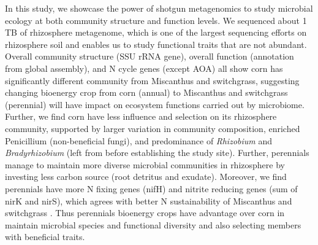 \documentclass[]{msu-thesis}
\begin{document}
In this study, we showcase the power of shotgun metagenomics to study microbial ecology at both community structure and function levels. We sequenced about 1 TB of rhizosphere metagenome, which is one of the largest sequencing efforts on rhizosphere soil and enables us to study functional traits that are not abundant. Overall community structure (SSU rRNA gene), overall function (annotation from global assembly), and N cycle genes (except AOA) all show corn has significantly different community from Miscanthus and switchgrass, suggesting changing bioenergy crop from corn (annual) to Miscanthus and switchgrass (perennial) will have impact on ecosystem functions carried out by microbiome. Further, we find corn have less influence and selection on its rhizosphere community, supported by larger variation in community composition, enriched Penicillium (non-beneficial fungi), and predominance of \textit{Rhizobium} and \textit{Bradyrhizobium} (left from before establishing the study site). Further, perennials manage to maintain more diverse microbial communities in rhizosphere by investing less carbon source (root detritus and exudate). Moreover, we find perennials have more N fixing genes (nifH) and nitrite reducing genes (sum of nirK and nirS), which agrees with better N sustainability of Miscanthus and switchgrass \cite{schwarz_effect_1994,parrish_biology_2005}. Thus perennials bioenergy crops have advantage over corn in maintain microbial species and functional diversity and also selecting members with beneficial traits.


%
\backmatter
%
%
\makebibliographypage %
%
\SingleSpacing
%
%



\end{document}
